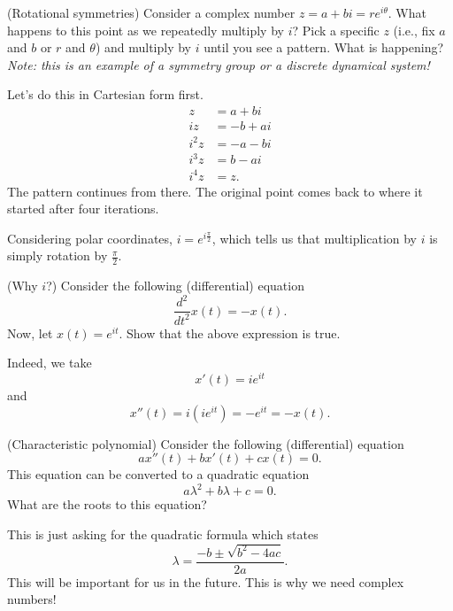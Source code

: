 \documentclass[12pt]{article} %
\begin{document}
\begin{problem}
(Rotational symmetries) Consider a complex number $z=a+bi=re^{i\theta}$. What happens to this point as we repeatedly multiply by $i$? Pick a specific $z$ (i.e., fix $a$ and $b$ or $r$ and $\theta$) and multiply by $i$ until you see a pattern.  What is happening? \emph{Note: this is an example of a symmetry group or a discrete dynamical system!}
\end{problem}
\begin{solution}
Let's do this in Cartesian form first.
\begin{align*}
    z &= a+bi\\
    iz &= -b+ai\\
    i^2z &= -a-bi\\
    i^3z &= b-ai\\
    i^4z &= z.
\end{align*}
The pattern continues from there. The original point comes back to where it started after four iterations. 

Considering polar coordinates, $i=e^{i\frac{\pi}{2}}$, which tells us that multiplication by $i$ is simply rotation by $\frac{\pi}{2}$.
\end{solution}

\newpage

\begin{problem}
(Why $i$?) Consider the following (differential) equation
\[
\frac{d^2}{dt^2}x(t)=-x(t).
\]
Now, let $x(t)=e^{it}$.  Show that the above expression is true.
\end{problem}
\begin{solution}
Indeed, we take
\[
x'(t)=ie^{it}
\]
and
\[
x''(t)=i\left(ie^{it}\right)=-e^{it}=-x(t).
\]
\end{solution}

\newpage

\begin{problem}
(Characteristic polynomial) Consider the following (differential) equation
\[
ax''(t)+bx'(t)+cx(t)=0.
\]
This equation can be converted to a quadratic equation
\[
a\lambda^2 + b\lambda + c = 0.
\]
What are the roots to this equation?
\end{problem}
\begin{solution}
This is just asking for the quadratic formula which states
\[
\lambda = \frac{-b\pm \sqrt{b^2-4ac}}{2a}.
\]
This will be important for us in the future. This is why we need complex numbers!
\end{solution}

\newpage
\end{document}

